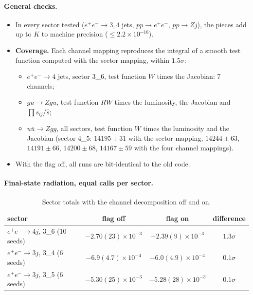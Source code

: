 \documentclass[11pt,a4paper]{article}
\begin{document}
\paragraph{General checks.}
\begin{itemize}
\item In every sector tested ($e^+e^-\to3,4$ jets, $pp\to e^+e^-$,
      $pp\to Zj$), the pieces add up to $K$ to machine precision
      ($\le2.2\times10^{-16}$).
\item \textbf{Coverage.} Each channel mapping reproduces the integral of a
      smooth test function computed with the sector mapping, within
      $1.5\sigma$:
      \begin{itemize}
      \item $e^+e^-\to4$ jets, sector 3\_6, test function $W$ times the
            Jacobian: 7 channels;
      \item $gu\to Zgu$, test function $RW$ times the luminosity, the
            Jacobian and $\prod s_{ij}/\hat s$;
      \item $u\bar u\to Zgg$, all sectors, test function $W$ times the
            luminosity and the Jacobian (sector 4\_5: $14195\pm31$ with the
            sector mapping, $14244\pm63$, $14191\pm66$, $14200\pm68$,
            $14167\pm59$ with the four channel mappings).
      \end{itemize}
\item With the flag off, all runs are bit-identical to the old code.
\end{itemize}

\paragraph{Final-state radiation, equal calls per sector.}
\begin{table}[h]
\centering
\begin{tabular}{lccc}
\toprule
sector & flag off & flag on & difference \\
\midrule
$e^+e^-\to4j$, 3\_6 (10 seeds) & $-2.70(23)\times10^{-3}$ & $-2.39(9)\times10^{-3}$ & $1.3\sigma$\\
$e^+e^-\to3j$, 3\_4 (6 seeds)  & $-6.9(4.7)\times10^{-4}$ & $-6.0(4.9)\times10^{-4}$ & $0.1\sigma$\\
$e^+e^-\to3j$, 3\_5 (6 seeds)  & $-5.30(25)\times10^{-3}$ & $-5.28(28)\times10^{-3}$ & $0.1\sigma$\\
\bottomrule
\end{tabular}
\caption{Sector totals with the channel decomposition off and on.}
\end{table}
\end{document}
